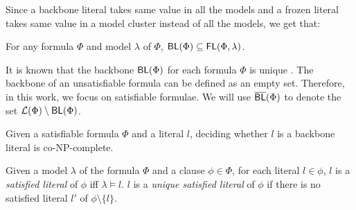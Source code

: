 Since a backbone literal takes same value in all the models and a frozen literal takes same value in a model cluster instead of all the models,
we get that:

\begin{proposition}\label{prop:Frozen-backbone}
For any formula $\Phi$ and model $\lambda$ of $\Phi$, $\textsf{BL}(\Phi)\subseteq\textsf{FL}(\Phi,\lambda)$.
\end{proposition}


It is known that the backbone $\textsf{BL}(\Phi)$ for each formula $\Phi$ is unique \cite{JLM15}.
The backbone of an unsatisfiable formula can be defined as an empty set. Therefore, in this work, we focus on satisfiable formulae.
We will use $\overline{\textsf{BL}}(\Phi)$ to denote the set
${\cal L}(\Phi)\setminus \textsf{BL}(\Phi)$.

\begin{theorem}
\label{thm:co-NP}\cite{Jan10}
Given a satisfiable formula $\Phi$ and a literal $l$, deciding whether $l$ is a backbone literal is co-NP-complete.
\end{theorem}


\begin{definition}
Given a model $\lambda$ of the formula $\Phi$ and a clause $\phi\in\Phi$, for each literal $l\in\phi$, $l$ is a \emph{satisfied literal}
of $\phi$ iff $\lambda\models l$. $l$ is a \emph{unique satisfied literal} of $\phi$ if there is no satisfied literal $l'$ of $\phi\setminus\{l\}$.
\end{definition}


